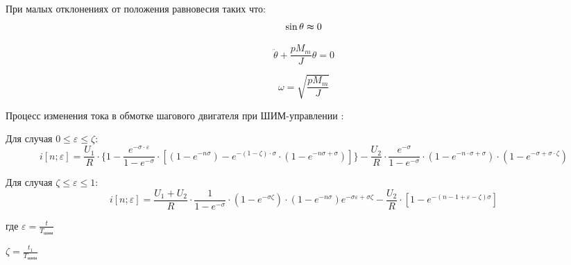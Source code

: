 При малых отклонениях от положения равновесия таких что:
\begin{equation}
    \sin{\theta} \thickapprox 0
\end{equation}

\begin{equation}
    \label{rotor_like_harmonical_oscilator_equation}
    \ddot{\theta} + \frac{p M_{m}}{J} \theta = 0
\end{equation}

\begin{equation}
    \label{friquent_for_rotor_self_oscilating}
    \omega = \sqrt{ \frac{p M_{m}}{J} }
\end{equation}

Процесс изменения тока в обмотке шагового двигателя при ШИМ-управлении \cite[гл. 6.4, стр. 239]{Chilikin}:

Для случая $0 \le \varepsilon \le \zeta$:
\begin{equation}
    \label{winding_current_with_pwm_control_1}
    i[ n; \varepsilon ] = \frac{ U_1 }{ R }
                            \cdot \{ 1
                                     - \frac { e^{ -\sigma \cdot \varepsilon } } { 1 - e^{-\sigma} }
                                            \cdot [ (1 - e^{-n\sigma})
                                                    - e^{ -(1 - \zeta) \cdot \sigma }
                                                        \cdot ( 1 - e^{-n\sigma + \sigma} )
                                                  ]
                                  \}
                        - \frac{ U_2 }{ R }
                            \cdot \frac {e^{-\sigma}} {1 - e^{-\sigma}}
                            \cdot ( 1 - e^{ -n \cdot \sigma + \sigma } )
                            \cdot ( 1 - e^{ -\sigma + \sigma \cdot \zeta } )
\end{equation}

Для случая $\zeta \le \varepsilon \le 1$:
\begin{equation}
    \label{winding_current_with_pwm_control_0}
    i[n; \varepsilon] =
        \frac{ U_{1} + U_{2} }{ R }
            \cdot \frac{ 1 }{ 1 - e^{-\sigma} }
            \cdot (1 - e^{-\sigma\zeta})
            \cdot (1 - e^{-n\sigma})e^{-\sigma\varepsilon + \sigma\zeta}
        - \frac{ U_{2} }{ R }
            \cdot [ 1 - e^{ -( n - 1 + \varepsilon - \zeta ) \sigma } ]
\end{equation}

где $\varepsilon = \frac{ t }{ T_\textit{шим} }$

$\zeta = \frac{ t_{1} }{ T_\textit{шим} }$

